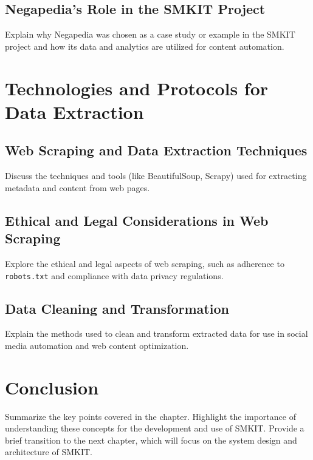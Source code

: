 \subsection{Negapedia's Role in the SMKIT Project}
\label{subsec:negapedia_s_role_in_the_smkit_project}
Explain why Negapedia was chosen as a case study or example in the SMKIT project and how its data and analytics are utilized for content automation.

\section{Technologies and Protocols for Data Extraction}
\label{sec:technologies_and_protocols_for_data_extraction}

\subsection{Web Scraping and Data Extraction Techniques}
\label{subsec:web_scraping_and_data_extraction_techniques}
Discuss the techniques and tools (like BeautifulSoup, Scrapy) used for extracting metadata and content from web pages.

\subsection{Ethical and Legal Considerations in Web Scraping}
\label{subsec:ethical_and_legal_considerations_in_web_scraping}
Explore the ethical and legal aspects of web scraping, such as adherence to \texttt{robots.txt} and compliance with data privacy regulations.

\subsection{Data Cleaning and Transformation}
\label{subsec:data_cleaning_and_transformation}
Explain the methods used to clean and transform extracted data for use in social media automation and web content optimization.

\section{Conclusion}
\label{sec:preliminaries_conclusion}
Summarize the key points covered in the chapter.
Highlight the importance of understanding these concepts for the development and use of SMKIT. Provide a brief transition to the next chapter, which will focus on the system design and architecture of SMKIT.
